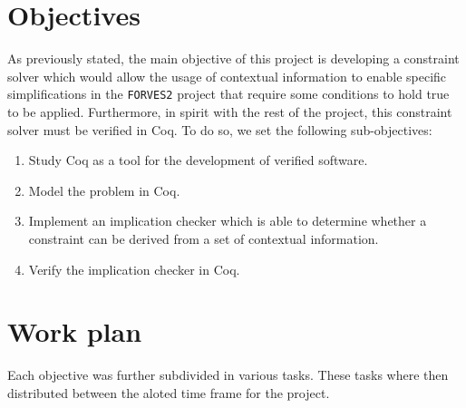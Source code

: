 \section{Objectives}
\label{sect:objectives}

As previously stated, the main objective of this project is developing a constraint solver which would
allow the usage of contextual information to enable specific simplifications in the \verb|FORVES2| project
that require some conditions to hold true to be applied. Furthermore, in spirit with the rest of the
project, this constraint solver must be verified in Coq. To do so, we set the following sub-objectives:

\begin{enumerate}
    \item Study Coq as a tool for the development of verified software.
    \item Model the problem in Coq.
    \item Implement an implication checker which is able to determine whether a constraint can be derived from a set of contextual information.
    \item Verify the implication checker in Coq.
\end{enumerate}

\section{Work plan}
\label{sect:work-plan}

Each objective was further subdivided in various tasks. These tasks where then distributed between the aloted
time frame for the project.

